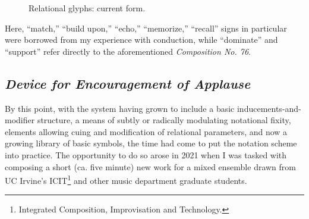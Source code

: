         \begin{figure}
            \centering
            \captionsetup{width=.5\textwidth} 
            \caption{Relational glyphs: current form.}
            \label{fig:relational2}
        \end{figure}

    \noindent Here, ``match,'' ``build upon,'' ``echo,'' ``memorize,'' ``recall'' signs in particular were borrowed from my experience with conduction, while ``dominate'' and ``support'' refer directly to the aforementioned \textit{Composition No. 76}.


    \subsection{\textit{Device for Encouragement of Applause}}

    By this point, with the system having grown to include a basic inducements-and-modifier structure, a means of subtly or radically modulating notational fixity, elements allowing cuing and modification of relational parameters, and now a growing library of basic symbols, the time had come to put the notation scheme into practice. The opportunity to do so arose in 2021 when I was tasked with composing a short (ca. five minute) new work for a mixed ensemble drawn from UC Irvine's ICIT\footnote{Integrated Composition, Improvisation and Technology.} and other music department graduate students.


